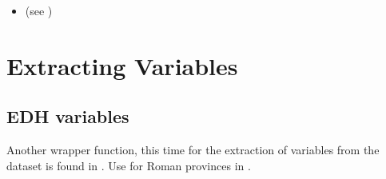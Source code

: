 \documentclass[a4paper,12pt,english]{sphinxhowto}
\begin{document}
\begin{sphinxVerbatim}[commandchars=\\\{\},formatcom=\footnotesize]
 \PYG{n}{[}\PYG{n}{[1}\PYG{n}{]}\PYG{n}{]}

 \PYG{n}{[}\PYG{n}{[1}\PYG{n}{]}\PYG{n}{]}\PYG{n}{[}\PYG{n}{[1}\PYG{n}{]}\PYG{n}{]} 


 \PYG{n}{[}\PYG{n}{[1}\PYG{n}{]}\PYG{n}{]}\PYG{n}{[}\PYG{n}{[3}\PYG{n}{]}\PYG{n}{]} 
\PYG{n}{[1}\PYG{n}{]}               
\end{sphinxVerbatim}

\begin{itemize}
\item {} 
(see {\hyperref[\detokenize{EDHVariables:edh-attr}]{}})

\end{itemize}



\section{Extracting  Variables}
\label{\detokenize{EDHVariables:extracting-edh-variables}}\label{\detokenize{EDHVariables:edh-vars}}\label{\detokenize{EDHVariables::doc}}


\subsection{EDH variables}
\label{\detokenize{EDHVariables:edh-variables}}\label{\detokenize{EDHVariables:edhw-fun}}
Another wrapper function, this time for the extraction of variables from the  dataset is found in .
Use  for Roman provinces in .
\end{document}
